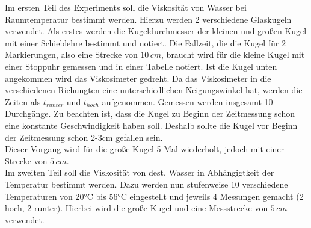Im ersten Teil des Experiments soll die Viskosität von Wasser bei Raumtemperatur bestimmt werden. Hierzu werden 2 verschiedene Glaskugeln verwendet. Als erstes werden die 
Kugeldurchmesser der kleinen und großen Kugel mit einer Schieblehre bestimmt und notiert. 
Die Fallzeit, die die Kugel für 2 Markierungen, also eine Strecke von $10\,\unit{cm}$, braucht wird für die kleine Kugel mit einer Stoppuhr
gemessen und in einer Tabelle notiert. Ist die Kugel unten angekommen wird das Viskosimeter gedreht.
Da das Viskosimeter in die verschiedenen Richungten eine unterschiedlichen Neigungswinkel hat, werden die Zeiten als $t_{runter}$ und $t_{hoch}$ aufgenommen.
Gemessen werden insgesamt 10 Durchgänge.
Zu beachten ist, dass die Kugel zu Beginn der Zeitmessung schon eine konstante Geschwindigkeit haben soll. Deshalb sollte die Kugel vor Beginn der Zeitmessung schon 2-3cm gefallen sein.
\\
Dieser Vorgang wird für die große Kugel 5 Mal wiederholt, jedoch mit einer Strecke von $5\,\unit{cm}$.
\\
Im zweiten Teil soll die Viskosität von dest. Wasser in Abhängigtkeit der Temperatur bestimmt werden. Dazu werden nun stufenweise 10 verschiedene Temperaturen 
von 20°C bis 56°C eingestellt und jeweils 4 Messungen gemacht (2 hoch, 2 runter). Hierbei wird die große Kugel und eine Messstrecke von $5\,\unit{cm}$ verwendet.
\newpage